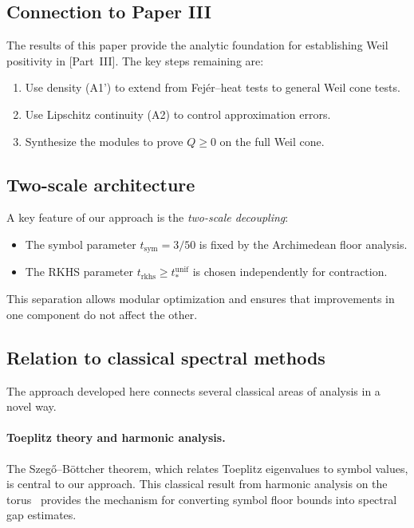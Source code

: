 \documentclass[11pt,a4paper]{article}
\theoremstyle{definition}
\theoremstyle{remark}
\begin{document}
\subsection{Connection to Paper III}

The results of this paper provide the analytic foundation for establishing Weil positivity in [Part~III]. The key steps remaining are:

\begin{enumerate}
\item Use density (A1') to extend from Fej\'er--heat tests to general Weil cone tests.
\item Use Lipschitz continuity (A2) to control approximation errors.
\item Synthesize the modules to prove $Q \geq 0$ on the full Weil cone.
\end{enumerate}

\subsection{Two-scale architecture}

A key feature of our approach is the \emph{two-scale decoupling}:

\begin{itemize}
\item The symbol parameter $t_{\mathrm{sym}} = 3/50$ is fixed by the Archimedean floor analysis.
\item The RKHS parameter $t_{\mathrm{rkhs}} \geq t_*^{\mathrm{unif}}$ is chosen independently for contraction.
\end{itemize}

This separation allows modular optimization and ensures that improvements in one component do not affect the other.

\subsection{Relation to classical spectral methods}

The approach developed here connects several classical areas of analysis in a novel way.

\paragraph{Toeplitz theory and harmonic analysis.}
The Szeg\H{o}--B\"ottcher theorem, which relates Toeplitz eigenvalues to symbol values, is central to our approach. This classical result from harmonic analysis on the torus~\cite{GrenanderSzego1958,BoettcherSilbermann2006} provides the mechanism for converting symbol floor bounds into spectral gap estimates.
\end{document}
